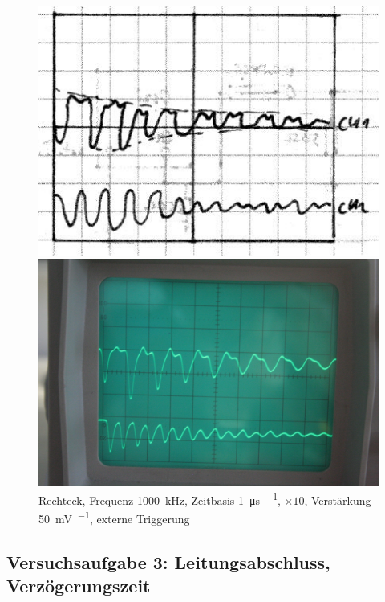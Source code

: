 \begin{figure}
	\centering
	\begin{minipage}{.45\linewidth}
	\includegraphics[width=\linewidth]{Skizzen/IMG_0759-1500.jpg}
	\end{minipage}
	\hfill
	\begin{minipage}{.45\linewidth}
	\includegraphics[width=\linewidth]{Fotos/IMG_0759-1500.jpg}
	\end{minipage}
	\caption{%
		Rechteck, Frequenz \SI{1000}{\kilo\hertz},
		Zeitbasis \SI{1}{\micro\second\per\division},
		$\times 10$,
		Verstärkung \SI{50}{\milli\volt\per\division},
		externe Triggerung
	}
	\label{fig:0759}
\end{figure}

\FloatBarrier
\subsection{Versuchsaufgabe 3: Leitungsabschluss, Verzögerungszeit}


